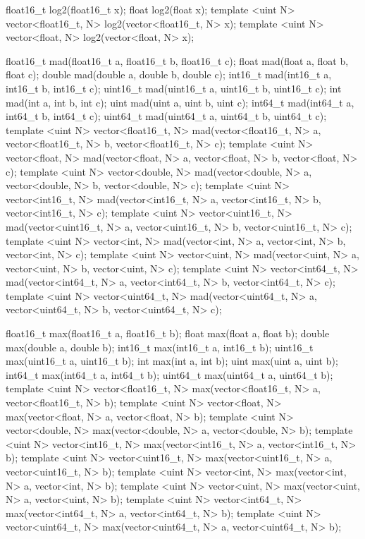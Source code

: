 \begin{HLSL}
float16_t log2(float16_t x);
float log2(float x);
template <uint N> vector<float16_t, N> log2(vector<float16_t, N> x);
template <uint N> vector<float, N> log2(vector<float, N> x);

float16_t mad(float16_t a, float16_t b, float16_t c);
float mad(float a, float b, float c);
double mad(double a, double b, double c);
int16_t mad(int16_t a, int16_t b, int16_t c);
uint16_t mad(uint16_t a, uint16_t b, uint16_t c);
int mad(int a, int b, int c);
uint mad(uint a, uint b, uint c);
int64_t mad(int64_t a, int64_t b, int64_t c);
uint64_t mad(uint64_t a, uint64_t b, uint64_t c);
template <uint N>
vector<float16_t, N> mad(vector<float16_t, N> a, vector<float16_t, N> b,
                         vector<float16_t, N> c);
template <uint N>
vector<float, N> mad(vector<float, N> a, vector<float, N> b,
                     vector<float, N> c);
template <uint N>
vector<double, N> mad(vector<double, N> a, vector<double, N> b,
                      vector<double, N> c);
template <uint N>
vector<int16_t, N> mad(vector<int16_t, N> a, vector<int16_t, N> b,
                       vector<int16_t, N> c);
template <uint N>
vector<uint16_t, N> mad(vector<uint16_t, N> a, vector<uint16_t, N> b,
                        vector<uint16_t, N> c);
template <uint N>
vector<int, N> mad(vector<int, N> a, vector<int, N> b, vector<int, N> c);
template <uint N>
vector<uint, N> mad(vector<uint, N> a, vector<uint, N> b, vector<uint, N> c);
template <uint N>
vector<int64_t, N> mad(vector<int64_t, N> a, vector<int64_t, N> b,
                       vector<int64_t, N> c);
template <uint N>
vector<uint64_t, N> mad(vector<uint64_t, N> a, vector<uint64_t, N> b,
                        vector<uint64_t, N> c);

float16_t max(float16_t a, float16_t b);
float max(float a, float b);
double max(double a, double b);
int16_t max(int16_t a, int16_t b);
uint16_t max(uint16_t a, uint16_t b);
int max(int a, int b);
uint max(uint a, uint b);
int64_t max(int64_t a, int64_t b);
uint64_t max(uint64_t a, uint64_t b);
template <uint N>
vector<float16_t, N> max(vector<float16_t, N> a, vector<float16_t, N> b);
template <uint N> vector<float, N> max(vector<float, N> a, vector<float, N> b);
template <uint N>
vector<double, N> max(vector<double, N> a, vector<double, N> b);
template <uint N>
vector<int16_t, N> max(vector<int16_t, N> a, vector<int16_t, N> b);
template <uint N>
vector<uint16_t, N> max(vector<uint16_t, N> a, vector<uint16_t, N> b);
template <uint N> vector<int, N> max(vector<int, N> a, vector<int, N> b);
template <uint N> vector<uint, N> max(vector<uint, N> a, vector<uint, N> b);
template <uint N>
vector<int64_t, N> max(vector<int64_t, N> a, vector<int64_t, N> b);
template <uint N>
vector<uint64_t, N> max(vector<uint64_t, N> a, vector<uint64_t, N> b);


\end{HLSL}
